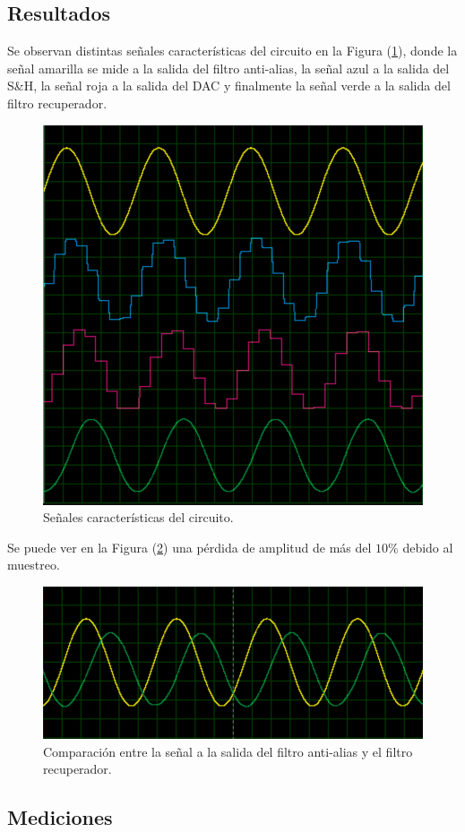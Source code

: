 \subsection{Resultados}

Se observan distintas señales características del circuito en la Figura (\ref{result1}), donde la señal amarilla se mide a la salida del filtro anti-alias, la señal azul a la salida del S\&H, la señal roja a la salida del DAC y finalmente la señal verde a la salida del filtro recuperador.

\begin{figure}[H]
\centering
\includegraphics[width=0.6\linewidth, page=1]{ImagenesEjercicio1/result1.png}
\caption{Señales características del circuito.}
\label{result1}
\end{figure}

Se puede ver en la Figura (\ref{result2}) una pérdida de amplitud de más del $10\%$ debido al muestreo.

\begin{figure}[H]
\centering
\includegraphics[width=0.8\linewidth, page=1]{ImagenesEjercicio1/result2.png}
\caption{Comparación entre la señal a la salida del filtro anti-alias y el filtro recuperador.}
\label{result2}
\end{figure}

\subsection{Mediciones}

